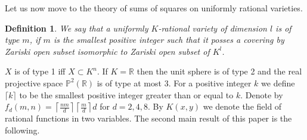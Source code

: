 \documentclass[12pt,reqno]{amsart}   	%
\newtheorem{df}[thm]{Definition}
\theoremstyle{obs}
\theoremstyle{prob}
\theoremstyle{conj}
\theoremstyle{remark}
\newcommand{\R}{\mathbb{R}}
\begin{document}
Let us now move to the theory of sums of squares on uniformly rational varieties.
\begin{df}
We say that a uniformly $K$-rational variety of dimension $l$ is of type $m$, if $m$ is the smallest positive integer such that it posses a covering by Zariski open subset isomorphic to Zariski open subset of $K^l$.

\end{df}
$X$ is of type 1 iff $X \subset K^n$. If $K=\R$ then the unit sphere is of type 2 and the real projective space $\mathbb{P}^2(\R)$ is of type at most 3.
For a positive integer $k$ we define $\lceil k \rceil$ to be the smallest positive integer greater than or equal to $k$.  Denote by $f_d(m,n)=\left\lceil\frac{nm}{d} \right\rceil \left\lceil\frac{m}{d}\right\rceil d$ for $d=2,4,8$. By $K(x,y)$ we denote the field of rational functions in two variables. The second main result of this paper is the following.
\end{document}
